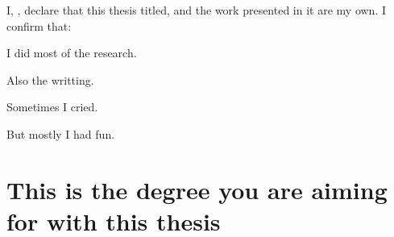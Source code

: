 \documentclass[
11pt, %
oneside, %
english, %
singlespacing, %
]{macthesis} %
\begin{document}


\begin{declaration}
\addchaptertocentry{\authorshipname}

\noindent I, \authorname, declare that this thesis titled, \emph{\ttitle} and the work presented in it are my own. I confirm that:

I did most of the research.

Also the writting.

Sometimes I cried.

But mostly I had fun.

\end{declaration}


\label{lastoffront}
\clearpage


\mainmatter %
\pagestyle{thesis}
\chapter{This is the degree you are aiming for with this thesis}\label{this-is-the-degree-you-are-aiming-for-with-this-thesis}
\end{document}
